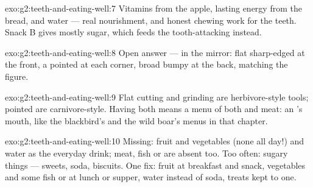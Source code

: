 \begin{solution}{exo:g2:teeth-and-eating-well:7}
Vitamins from the apple, lasting energy from the bread, and water
--- real nourishment, and honest chewing work for the teeth.
Snack B gives mostly sugar, which feeds the tooth-attacking 
instead.
\end{solution}

\begin{solution}{exo:g2:teeth-and-eating-well:8}
Open answer --- in the mirror: flat sharp-edged  at the
front, a pointed  at each corner, broad bumpy  at the
back, matching the figure.
\end{solution}

\begin{solution}{exo:g2:teeth-and-eating-well:9}
Flat cutting  and grinding  are herbivore-style
tools; pointed  are carnivore-style. Having both means a
menu of both  and meat: an 's mouth, like the
blackbird's and the wild boar's menus in that chapter.
\end{solution}

\begin{solution}{exo:g2:teeth-and-eating-well:10}
Missing: fruit and vegetables (none all day!) and water as the
everyday drink; meat, fish or  are absent too. Too often:
sugary things --- sweets, soda, biscuits. One fix: fruit at
breakfast and snack, vegetables and some fish or  at lunch or
supper, water instead of soda, treats kept to one.
\end{solution}
